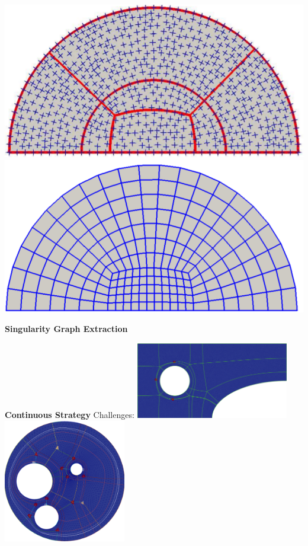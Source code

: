 \documentclass[8pt]{beamer}
\begin{document}
{%
\includegraphics[width=0.24\linewidth]{3}
\includegraphics[width=0.24\linewidth]{4}
\newline
\begin{minipage}[!T]{1.0\linewidth}
\begin{center}
\textbf{Singularity Graph Extraction}
\end{center}
\end{minipage}
\newline
\begin{minipage}[!T]{1.0\linewidth}
\begin{minipage}[!T]{0.48\linewidth}
\begin{center}
\textbf{Continuous Strategy}
\newline
Challenges:
\newline
\includegraphics[width=0.5\textwidth]{HIS4-sim-Rad002}
\newline
\includegraphics[width=0.4\textwidth]{Circle_with_circle_holes_refSS1-cycle}

\end{center}
\end{minipage}
\end{minipage}}
\end{document}
